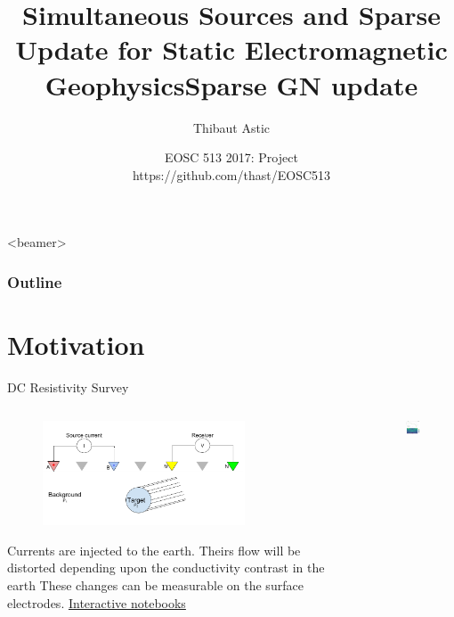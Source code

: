 \documentclass[12pt]{beamer}
\author[]{%
  Thibaut Astic
  }
\title[]{Simultaneous Sources and Sparse Update for Static Electromagnetic Geophysics}
\date[]{EOSC 513 2017: Project \\ https://github.com/thast/EOSC513}
\begin{document}
\begin{frame}
  \titlepage
\end{frame}



\title{Sparse GN update}
  \begin{frame}<beamer>
    \frametitle{Outline}
    \tableofcontents
  \end{frame}



\section{Motivation}
\begin{frame}{DC Resistivity Survey}

\begin{columns}
\begin{column}{0.5\textwidth}

\begin{figure}[t!]
    \includegraphics[width=60mm, left]{figures/DCR_Setup_Cylinder.png}
\end{figure}

Currents are injected to the earth. Theirs flow will be distorted depending upon the conductivity contrast in the earth
These changes can be measurable on the surface electrodes. 
\href{https://notebooks.azure.com/library/em_apps}{\color{blue} Interactive notebooks}

\end{column}
\begin{column}{0.5\textwidth}
\begin{figure}[t!]
    \includegraphics[width=60mm, left]{figures/DC_survey.png}
\end{figure}
\end{column}


\end{columns}
\end{frame}
\end{document}
